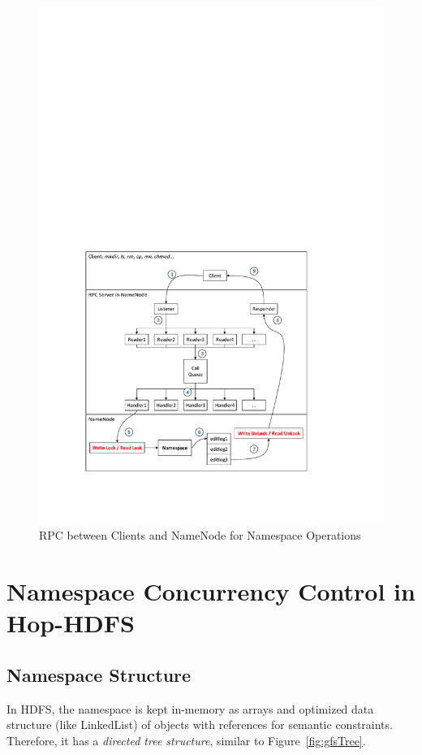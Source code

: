 \begin{figure}[h]
	\centering
	\includegraphics[scale=0.8]{figs/nnRPC.pdf}
	\caption{RPC between Clients and NameNode for Namespace Operations}
	\label{fig:nnRPC}
\end{figure}


\section{Namespace Concurrency Control in Hop-HDFS}

\subsection{Namespace Structure}
In HDFS, the namespace is kept in-memory as arrays and optimized data structure (like LinkedList) of objects with references for semantic constraints. Therefore, it has a \textit{directed tree structure}, similar to Figure~\ref{fig:gfsTree}. 

